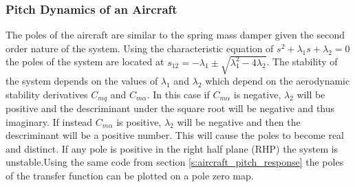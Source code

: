 \subsubsection{Pitch Dynamics of an Aircraft}

The poles of the aircraft are similar to the spring mass damper given the second order nature of the system. Using the characteristic equation of $s^2 + \lambda_1s + \lambda_2=0$ the poles of the system are located at $s_{12} = -\lambda_1 \pm \sqrt{\lambda_1^2 - 4\lambda_2}$. The stability of the system depends on the values of $\lambda_1$ and $\lambda_2$ which depend on the aerodynamic stability derivatives $C_{mq}$ and $C_{m\alpha}$. In this case if $C_{m\alpha}$ is negative, $\lambda_2$ will be positive and the descriminant under the square root will be negative and thus imaginary. If instead $C_{m\alpha}$ is positive, $\lambda_2$ will be negative and then the descriminant will be a positive number. This will cause the poles to become real and distinct. If any pole is positive in the right half plane (RHP) the system is unstable.Using the same code from section \ref{s:aircraft_pitch_response} the poles of the transfer function can be plotted on a pole zero map.
